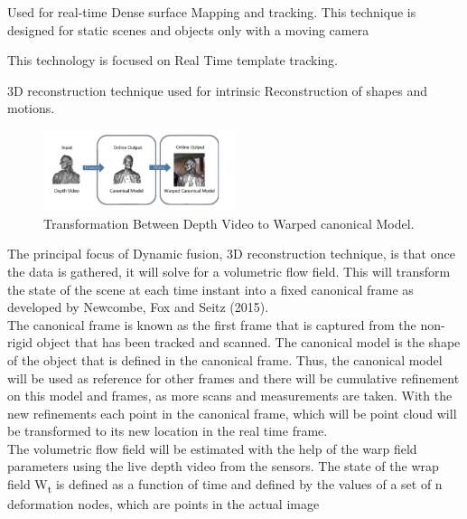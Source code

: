 \documentclass[a4paper]{thesis}
\begin{document}
\newpage
\begin{description}[style=nextline]
    \item[Kinect Fusion] Used for real-time Dense surface Mapping and tracking. This technique is designed for static scenes and objects only with a moving camera
    \item[DART (Dense Articulated Real Time Tracking)] This technology is focused on Real Time template tracking.
    \item[Animation Cartography] 3D reconstruction technique used for intrinsic Reconstruction of shapes and motions. 
\end{description}

\begin{figure} %
    \centering
    \includegraphics[width=0.5\textwidth]{IMG_0073.png}
    \caption{Transformation Between Depth Video to Warped canonical Model. \cite[]{newcombe_fox_seitz_2015}}
\end{figure}
The principal focus of Dynamic fusion, 3D reconstruction technique, is that once the data is gathered, it will solve for a volumetric flow field. 
This will transform the state of the scene at each time instant into a fixed canonical frame as developed by Newcombe, Fox and Seitz (2015). \\[10pt]
The canonical frame is known as the first frame that is captured from the non-rigid object that has been tracked and scanned. The canonical model is the shape of the object that is defined in the canonical frame. 
Thus, the canonical model will be used as reference for other frames and there will be cumulative refinement on this model and frames, as more scans and  measurements are taken.
With the new refinements each point in the canonical frame, which will be point cloud will be transformed to its new location in the real time frame.\\[10pt]
The volumetric flow field will be estimated with the help of the warp field parameters using the live depth video from the sensors. 
The state of the wrap field W\textsubscript{t} is defined as a function of time and defined by the values of a set of n deformation nodes, which are points in the actual image
\end{document}
